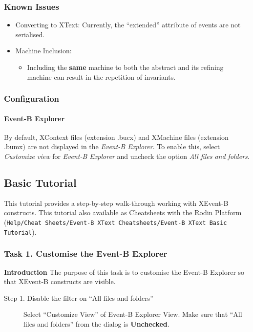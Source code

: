 \subsubsection{Known Issues}
\label{sec:known-issues}

\begin{itemize}
\item Converting to XText: Currently, the ``extended'' attribute of events are not serialised.

\item Machine Inclusion: 
\begin{itemize}
	\item Including the \textbf{same} machine to both the abstract and its refining machine can result in the repetition of invariants.
\end{itemize}

\end{itemize}

\subsubsection{Configuration}
\label{sec:configuration}

\paragraph{Event-B Explorer}
By default, XContext files (extension .bucx) and XMachine files (extension .bumx) are not displayed in the \emph{Event-B Explorer}. To enable this, select \emph{Customize view} for \emph{Event-B Explorer} and uncheck the option \emph{All files and folders}.

\subsection{Basic Tutorial}
\label{sec:basic-tutorial}

This tutorial provides a step-by-step walk-through working with XEvent-B constructs. This tutorial also available as Cheatsheets with the Rodin Platform (\texttt{Help/Cheat Sheets/Event-B XText Cheatsheets/Event-B XText Basic Tutorial}).

\subsubsection{Task 1. Customise the Event-B Explorer}
\textbf{Introduction}
The purpose of this task is to customise the Event-B Explorer so that XEvent-B constructs are visible.
\begin{description}
\item[Step 1. Disable the filter on ``All files and folders''] Select ``Customize View'' of Event-B Explorer View. Make sure that ``All files and folders'' from the dialog is \textbf{Unchecked}.
\end{description}

